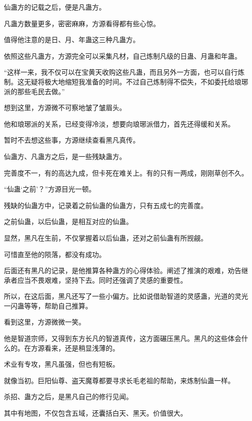 
\begin{this_body}



仙蛊方的记载之后，便是凡蛊方。

凡蛊方数量更多，密密麻麻，方源看得都有些心惊。

值得他注意的是日、月、年蛊这三种凡蛊方。

依照这些凡蛊方，方源完全可以采集凡材，自己炼制凡级的日蛊、月蛊和年蛊。

“这样一来，我不仅可以在宝黄天收购这些凡蛊，而且另外一方面，也可以自行炼制。这无疑将极大地缩短我准备的时间。不过自己炼制得不偿失，不如委托给琅琊派的那些毛民去做。”

想到这里，方源微不可察地皱了皱眉头。

他和琅琊派的关系，已经变得冷淡，想要向琅琊派借力，首先还得缓和关系。

暂时不去想这些事，方源继续查看黑凡真传。

仙蛊方、凡蛊方之后，是一些残缺蛊方。

完善度不一，有的高达九成，但卡死在难关上。有的只有一两成，刚刚草创不久。

“仙蛊‘之前’？”方源目光一顿。

残缺的仙蛊方中，记录着之前仙蛊的仙蛊方，只有五成七的完善度。

之前仙蛊，以后仙蛊，是相互对应的仙蛊。

显然，黑凡在生前，不仅掌握着以后仙蛊，还对之前仙蛊有所觊觎。

可惜直至他的陨落，都没有成功。

后面还有黑凡的记录，是他推算各种蛊方的心得体验。阐述了推演的艰难，劝告继承者应当不畏艰难，坚持下去。同时还强调了灵感的重要性。

所以，在这后面，黑凡还写了一些小偏方。比如说借助智道的灵感蛊，光道的灵光一闪蛊等等，帮助自己推算。

看到这里，方源微微一笑。

他是智道宗师，又得到东方长凡的智道真传，这方面碾压黑凡。黑凡的这些体会什么的。在方源看来，还是稍显浅薄的。

术业有专攻，黑凡虽强，但也有短板。

就像当初。巨阳仙尊、盗天魔尊都要寻求长毛老祖的帮助，来炼制仙蛊一样。

杀招、蛊方之后，是黑凡自己的修行见闻。

其中有地图，不仅包含五域，还囊括白天、黑天。价值很大。


\end{this_body}
